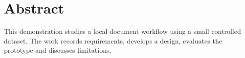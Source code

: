 \chapter*{Abstract}
This demonstration studies a local document workflow using a small controlled dataset. The work records requirements, develops a design, evaluates the prototype and discusses limitations.

